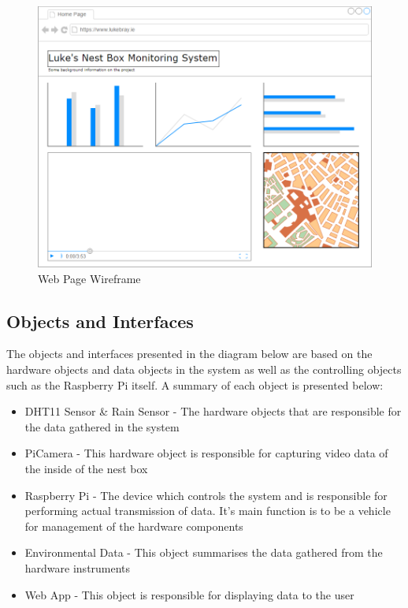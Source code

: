 \documentclass[10pt,a4paper]{article}
\begin{document}
\begin{figure}[H]
\centering
  \includegraphics[width=\linewidth]{images/web_page_mock_up.png}
  \caption{Web Page Wireframe}
  \label{fig:webwireframe}
\end{figure}

\subsection{Objects and Interfaces}
The objects and interfaces presented in the diagram below are based on the hardware objects and data objects in the system as well as the controlling objects such as the Raspberry Pi itself. A summary of each object is presented below:
\begin{itemize}
\item DHT11 Sensor \& Rain Sensor - The hardware objects that are responsible for the data gathered in the system
\item PiCamera - This hardware object is responsible for capturing video data of the inside of the nest box
\item Raspberry Pi - The device which controls the system and is responsible for performing actual transmission of data. It's main function is to be a vehicle for management of the hardware components
\item Environmental Data - This object summarises the data gathered from the hardware instruments
\item Web App - This object is responsible for displaying data to the user 
\end{itemize}
\end{document}
